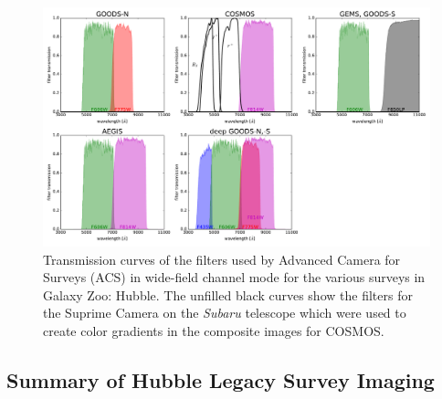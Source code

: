 \documentclass[usenatbib]{mn2e}
\begin{document}
\begin{figure}
\includegraphics[width=160mm]{figures/filter_curves.pdf}
\caption{Transmission curves of the filters used by \hst{} Advanced Camera for Surveys (ACS) in wide-field channel mode for the various surveys in Galaxy Zoo: Hubble. The unfilled black curves show the filters for the Suprime Camera on the \textit{Subaru} telescope which were used to create color gradients in the composite images for COSMOS.\label{fig:filtercurves}}
\end{figure}

\subsection{Summary of Hubble Legacy Survey Imaging}\label{ssec:legacy_surveys}
\end{document}
